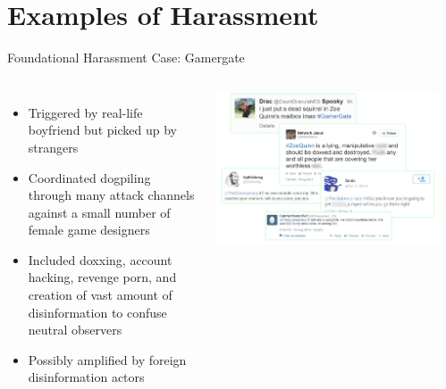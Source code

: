 \documentclass[nobackground,dvipsnames,table,aspectratio=169]{beamer}
\begin{document}
\section{Examples of Harassment}

\begin{frame}{Foundational Harassment Case: Gamergate}
    \begin{columns}
            \begin{itemize}
                \item Triggered by real-life boyfriend but picked up by strangers
                \item Coordinated dogpiling through many attack channels against a small number of female game designers
                \item Included doxxing, account hacking, revenge porn, and creation of vast amount of disinformation to confuse neutral observers
                \item Possibly amplified by foreign disinformation actors
            \end{itemize}
            \includegraphics[width=\textwidth]{zoe-quinn-harassment-tweets}
            \begin{columns}

\end{columns}
\end{columns}
\end{frame}
\end{document}
